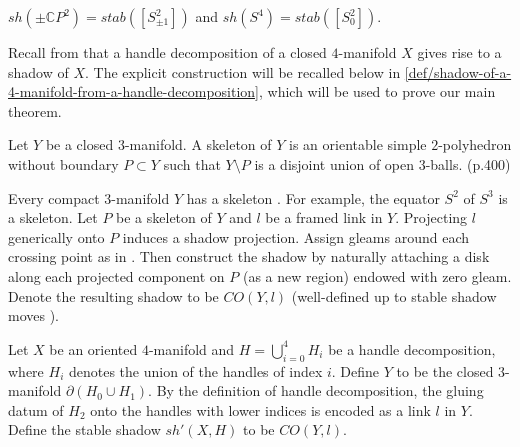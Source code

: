 \begin{example}
  $sh(\pm\mathbb{C}P^{2}) = stab([S^{2}_{\pm 1}])$ and
  $sh(S^{4}) = stab([S^{2}_{0}])$.
\end{example}

\noindent Recall from \cite[section
IX.4]{turaev-qiok-3-manifolds} that a handle decomposition of a
closed $4$-manifold $X$ gives rise to a shadow of $X$. The
explicit construction will be recalled below in
\ref{def/shadow-of-a-4-manifold-from-a-handle-decomposition},
which will be used to prove our main theorem.

\begin{definition}\label{def/skeleton-of-a-3-manifold}
  Let $Y$ be a closed $3$-manifold. A skeleton of $Y$ is an
  orientable simple $2$-polyhedron without boundary $P \subset Y$
  such that $Y \setminus P$ is a disjoint union of open
  $3$-balls. (p.400)
\end{definition}

\begin{definition}\label{def/shadow-cone-of-a-framed-link-in-a-3-manifold}
  \noindent Every compact $3$-manifold $Y$ has a skeleton
  \cite[theorem IX 2.1.1]{turaev-qiok-3-manifolds}. For example,
  the equator $S^{2}$ of $S^{3}$ is a skeleton. Let $P$ be a
  skeleton of $Y$ and $l$ be a framed link in $Y$. Projecting $l$
  generically onto $P$ induces a shadow projection. Assign gleams
  around each crossing point as in \cite[figure
  IX.3.4]{turaev-qiok-3-manifolds}. Then construct the shadow by
  naturally attaching a disk along each projected component on
  $P$ (as a new region) endowed with zero gleam. Denote the
  resulting shadow to be $CO(Y,l)$ (well-defined up to stable
  shadow moves \cite[section IX.3.3]{turaev-qiok-3-manifolds}).
\end{definition}

\begin{definition}\label{def/shadow-of-a-4-manifold-from-a-handle-decomposition}
  Let $X$ be an oriented $4$-manifold and
  $H = \bigcup_{i=0}^{4} H_{i}$ be a handle decomposition, where
  $H_{i}$ denotes the union of the handles of index $i$. Define
  $Y$ to be the closed $3$-manifold $\partial(H_{0} \cup H_{1})$.
  By the definition of handle decomposition, the gluing datum of
  $H_{2}$ onto the handles with lower indices is encoded as a
  link $l$ in $Y$. Define the stable shadow $sh'(X,H)$ to be
  $CO(Y,l)$.
\end{definition}

